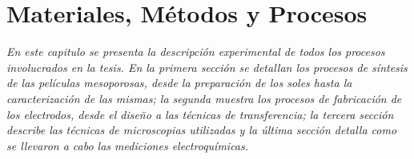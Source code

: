  \newcommand{\NoBiblioMat}[1]{
 \ifthenelse{\equal{#1}{verdadero}}{}{}
 \NoBiblioMat{verdadero}}


 \FormatoCapituloUnaLinea

 \chapter{Materiales, Métodos y Procesos}
 \label{chap:Materiales}

 \thispagestyle{empty}
	
  \noindent\textit{En este capitulo se presenta la descripción experimental de todos los procesos involucrados en la tesis. En la primera sección se detallan los procesos de síntesis de las películas mesoporosas, desde la preparación de los soles hasta la caracterización de las mismas; la segunda muestra los procesos de fabricación de los electrodos, desde el diseño a las técnicas de transferencia; la tercera sección describe las técnicas de microscopias utilizadas y la última sección detalla como se llevaron a cabo las mediciones electroquímicas.}


 \vfill
 \minitoc
 \newpage


